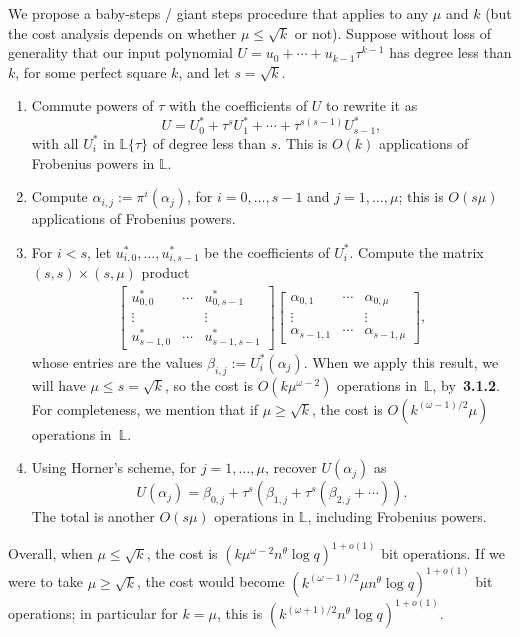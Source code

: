 \documentclass[sigconf]{acmart}
\renewcommand{\L}{\mathbb{L}}
\newcommand{\ang}[1]{\{#1\}}
\begin{document}
We propose a baby-steps / giant steps procedure that applies
to any $\mu$ and $k$ (but the cost analysis depends on whether
$\mu \le \sqrt{k}$ or not). Suppose without loss of
generality that our input polynomial $U = u_0 + \cdots +
u_{k-1}\tau^{k-1}$ has degree less than $k$, for some perfect square
$k$, and let $s=\sqrt{k}$.
\begin{enumerate}
\item Commute powers of $\tau$ with the coefficients of $U$ to rewrite it as 
$$U = U^*_{0} + \tau^s U^*_{1} + \cdots + \tau^{s(s-1)} U^*_{s-1},$$
  with all $U^*_i$ in $\L\ang{\tau}$ of degree less than $s$.
This is $O(k)$  applications of Frobenius powers in $\L$.
\item Compute $\alpha_{i,j}:=\pi^i(\alpha_j)$, for
  $i=0,\dots,s-1$ and $j=1,\dots,\mu$; this is $O(s \mu)$
applications of Frobenius powers.
\item For $i< s$, let $u^*_{i,0},\dots,u^*_{i,s-1}$ be 
the coefficients of $U^*_i$. Compute the matrix 
$(s,s) \times (s,\mu)$ product
\begin{align*}
\left [ \begin{matrix}
u^*_{0,0} & \cdots & u^*_{0,s-1} \\
\vdots && \vdots \\
u^*_{s-1,0} & \cdots & u^*_{s-1,s-1} 
  \end{matrix} \right ]
\left [ \begin{matrix}
\alpha_{0,1} & \cdots & \alpha_{0,\mu} \\
\vdots && \vdots \\
\alpha_{s-1,1} & \cdots & \alpha_{s-1,\mu} 
  \end{matrix} \right ],
\end{align*}
whose entries are the values $\beta_{i,j}:=U^*_{i}(\alpha_j)$.  When
we apply this result, we will have $\mu \le s = \sqrt{k}$, so the cost is $O(k
\mu^{\omega-2})$ operations in~$\L$, by~{\bf 3.1.2}. For completeness,
we mention that if $\mu \ge \sqrt{k}$, the cost is
$O(k^{(\omega-1)/2} \mu)$  operations in~$\L$.

\item Using Horner's scheme, for $j=1,\dots,\mu$, recover $U(\alpha_j)$ as 
$$U(\alpha_j) = \beta_{0,j} + \tau^s( \beta_{1,j} + \tau^s(\beta_{2,j}
  + \cdots )).$$ The total is another $O(s \mu)$ operations
in $\L$, including Frobenius powers.
\end{enumerate}
Overall, when $\mu \le \sqrt{k}$, the cost is $(k \mu^{\omega-2}
n^\theta \log q)^{1+ o(1)}$ bit operations. If we were to take $\mu\ge
\sqrt{k}$, the cost would become $(k^{(\omega-1)/2} \mu n^\theta \log
q)^{1+ o(1)}$ bit operations; in particular for $k=\mu$, this is
$(k^{(\omega+1)/2} n^\theta \log q)^{1+ o(1)}$.
\end{document}
